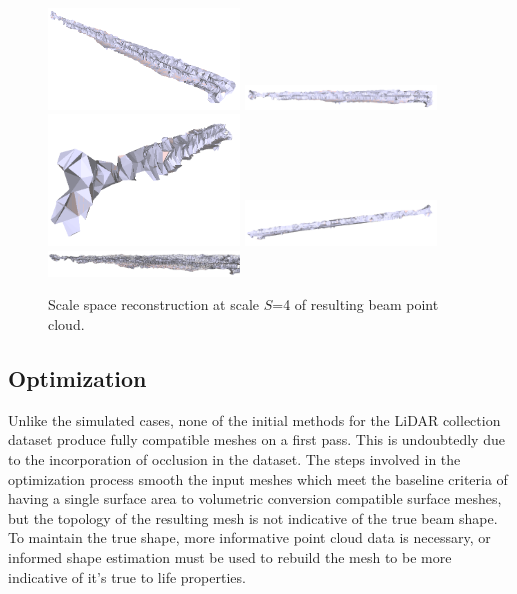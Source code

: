 \documentclass[12pt]{drexelthesis}
\let\Oldsubsection\subsection
\renewcommand{\subsection}{\FloatBarrier\Oldsubsection}
\begin{document}
\begin{figure}[!ht]
	\centering
		\includegraphics[width=2in]{real-lab-scans/meshed/scalespace400.png}
		\includegraphics[width=2in]{real-lab-scans/meshed/scalespace401.png}
		\includegraphics[width=2in]{real-lab-scans/meshed/scalespace402.png}
		\includegraphics[width=2in]{real-lab-scans/meshed/scalespace403.png}
		\includegraphics[width=2in]{real-lab-scans/meshed/scalespace404.png}
		\caption[Scale space reconstruction at scale $S$=4 of segmented LiDAR data]{\centering Scale space reconstruction at scale $S$=4 of resulting beam point cloud.}
	\label{lidar:scalespace4}
\end{figure}


\subsection{Optimization}

Unlike the simulated cases, none of the initial methods for the LiDAR collection dataset produce fully compatible meshes on a first pass. This is undoubtedly due to the incorporation of occlusion in the dataset. The steps involved in the optimization process smooth the input meshes which meet the baseline criteria of having a single surface area to volumetric conversion compatible surface meshes, but the topology of the resulting mesh is not indicative of the true beam shape. To maintain the true shape, more informative point cloud data is necessary, or informed shape estimation must be used to rebuild the mesh to be more indicative of it's true to life properties.
\end{document}
